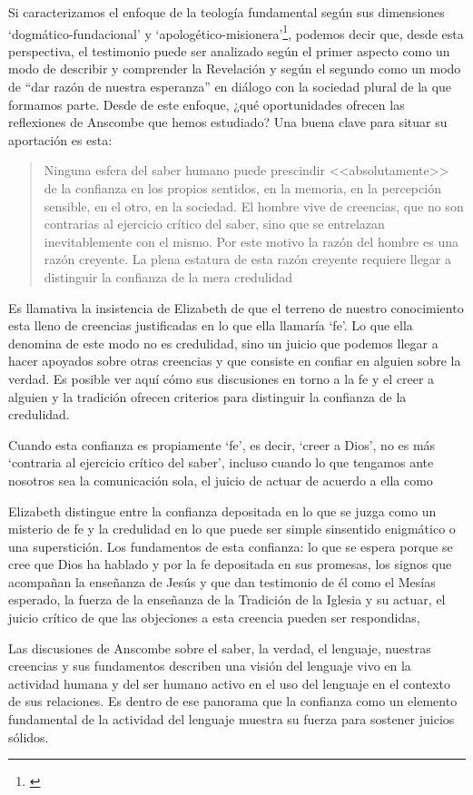 Si caracterizamos el enfoque de la teología fundamental según sus dimensiones `dogmático-fundacional' y `apologético-misionera'\footnote{\Cite[Cf.][80-85]{ninot2009tf}}, podemos decir que, desde esta perspectiva, el testimonio puede ser analizado según el primer aspecto como un modo de describir y comprender la Revelación y según el segundo como un modo de ``dar razón de nuestra esperanza'' en diálogo con la sociedad plural de la que formamos parte. Desde de este enfoque, ¿qué oportunidades ofrecen las reflexiones de Anscombe que hemos estudiado? Una buena clave para situar su aportación es esta: \blockquote[{\Cite[451]{prades2015testimonio}}]{Ninguna esfera del saber humano puede prescindir <<absolutamente>> de la confianza en los propios sentidos, en la memoria, en la percepción sensible, en el otro, en la sociedad. El hombre vive de creencias, que no son contrarias al ejercicio crítico del saber, sino que se entrelazan inevitablemente con el mismo. Por este motivo la razón del hombre es una razón creyente. La plena estatura de esta razón creyente requiere llegar a distinguir la confianza de la mera credulidad}. Es llamativa la insistencia de Elizabeth de que el terreno de nuestro conocimiento esta lleno de creencias justificadas en lo que ella llamaría `fe'. Lo que ella denomina de este modo no es credulidad, sino un juicio que podemos llegar a hacer apoyados sobre otras creencias y que consiste en confiar en alguien sobre la verdad. Es posible ver aquí cómo sus discusiones en torno a la fe y el creer a alguien y la tradición ofrecen criterios para distinguir la confianza de la credulidad.

Cuando esta confianza es propiamente `fe', es decir, `creer a Dios', no es más `contraria al ejercicio crítico del saber', incluso cuando lo que tengamos ante nosotros sea la comunicación sola, el juicio de actuar de acuerdo a ella como


Elizabeth distingue entre la confianza depositada en lo que se juzga como un misterio de fe y la credulidad en lo que puede ser simple sinsentido enigmático o una superstición. Los fundamentos de esta confianza: lo que se espera porque se cree que Dios ha hablado y por la fe depositada en sus promesas, los signos que acompañan la enseñanza de Jesús y que dan testimonio de él como el Mesías esperado, la fuerza de la enseñanza de la Tradición de la Iglesia y su actuar, el juicio crítico de que las objeciones a esta creencia pueden ser respondidas,



Las discusiones de Anscombe sobre el saber, la verdad, el lenguaje, nuestras creencias y sus fundamentos describen una visión del lenguaje vivo en la actividad humana y del ser humano activo en el uso del lenguaje en el contexto de sus relaciones. Es dentro de ese panorama que la confianza como un elemento fundamental de la actividad del lenguaje muestra su fuerza para sostener juicios sólidos.



